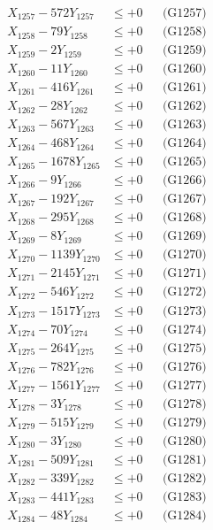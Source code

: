 \documentclass[a4paper,10pt]{article}
\begin{document}
{\begin{align}
X_{1257} - 572Y_{1257} &\leq +0 && \text{(G1257)} \\
X_{1258} - 79Y_{1258} &\leq +0 && \text{(G1258)} \\
X_{1259} - 2Y_{1259} &\leq +0 && \text{(G1259)} \\
X_{1260} - 11Y_{1260} &\leq +0 && \text{(G1260)} \\
\allowbreak
X_{1261} - 416Y_{1261} &\leq +0 && \text{(G1261)} \\
X_{1262} - 28Y_{1262} &\leq +0 && \text{(G1262)} \\
X_{1263} - 567Y_{1263} &\leq +0 && \text{(G1263)} \\
X_{1264} - 468Y_{1264} &\leq +0 && \text{(G1264)} \\
X_{1265} - 1678Y_{1265} &\leq +0 && \text{(G1265)} \\
X_{1266} - 9Y_{1266} &\leq +0 && \text{(G1266)} \\
X_{1267} - 192Y_{1267} &\leq +0 && \text{(G1267)} \\
X_{1268} - 295Y_{1268} &\leq +0 && \text{(G1268)} \\
X_{1269} - 8Y_{1269} &\leq +0 && \text{(G1269)} \\
X_{1270} - 1139Y_{1270} &\leq +0 && \text{(G1270)} \\
\allowbreak
X_{1271} - 2145Y_{1271} &\leq +0 && \text{(G1271)} \\
X_{1272} - 546Y_{1272} &\leq +0 && \text{(G1272)} \\
X_{1273} - 1517Y_{1273} &\leq +0 && \text{(G1273)} \\
X_{1274} - 70Y_{1274} &\leq +0 && \text{(G1274)} \\
X_{1275} - 264Y_{1275} &\leq +0 && \text{(G1275)} \\
X_{1276} - 782Y_{1276} &\leq +0 && \text{(G1276)} \\
X_{1277} - 1561Y_{1277} &\leq +0 && \text{(G1277)} \\
X_{1278} - 3Y_{1278} &\leq +0 && \text{(G1278)} \\
X_{1279} - 515Y_{1279} &\leq +0 && \text{(G1279)} \\
X_{1280} - 3Y_{1280} &\leq +0 && \text{(G1280)} \\
\allowbreak
X_{1281} - 509Y_{1281} &\leq +0 && \text{(G1281)} \\
X_{1282} - 339Y_{1282} &\leq +0 && \text{(G1282)} \\
X_{1283} - 441Y_{1283} &\leq +0 && \text{(G1283)} \\
X_{1284} - 48Y_{1284} &\leq +0 && \text{(G1284)} \\

\end{align}}
\end{document}
